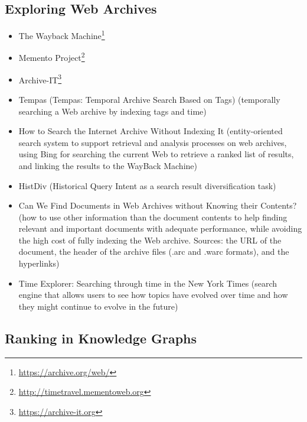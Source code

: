 \documentclass[runningheads,a4paper]{libtex/llncs}
\begin{document}
\subsection*{Exploring Web Archives}
\begin{itemize}
\item   The Wayback Machine\footnote{\url{https://archive.org/web/}}
\item   Memento Project\footnote{\url{http://timetravel.mementoweb.org}}
\item   Archive-IT\footnote{\url{https://archive-it.org}}
\item   Tempas (Tempas: Temporal Archive Search Based on Tags\cite{holzmann2016tempas})
        (temporally searching a Web archive by indexing tags and time)
\item   How to Search the Internet Archive Without Indexing It \cite{kanhabua2016search}
        (entity-oriented search system to support retrieval and analysis processes on web archives,
        using  Bing for searching the current Web to retrieve a ranked list of results, and linking
        the results to the WayBack Machine)
\item   HistDiv \cite{singh2016history} (Historical Query Intent as a search result diversification task)
\item   Can We Find Documents in Web Archives without Knowing their Contents? \cite{vo2016can}
        (how to use other information than the document contents to help finding relevant and
        important documents with adequate performance, while avoiding the high cost of
        fully indexing the Web archive. Sources: the URL of the document, the header
        of the archive files (.arc and .warc formats), and the hyperlinks)
\item   Time Explorer: Searching through time in the New York Times \cite{matthews2010searching}
        (search engine that allows users to see how topics have evolved over time and how
        they might continue to evolve in the future)
\end{itemize}


\subsection*{Ranking in Knowledge Graphs}
\end{document}
